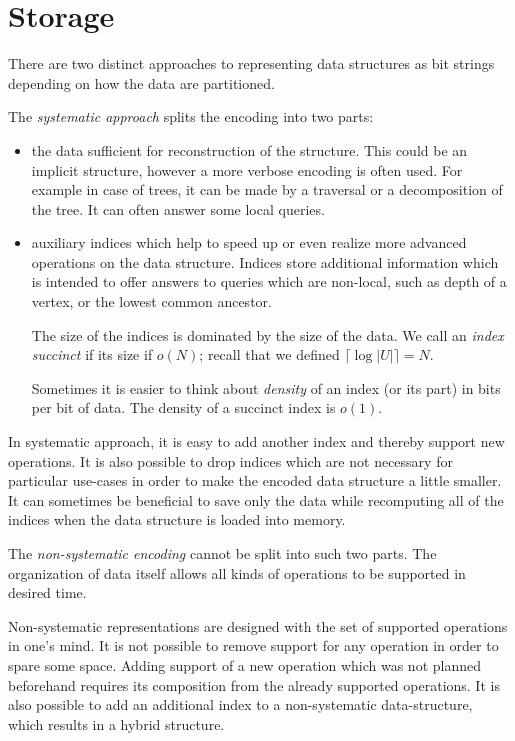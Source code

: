 \section{Storage}

There are two distinct approaches to representing data structures as bit strings depending on how the data are partitioned.

The \emph{systematic approach} splits the encoding into two parts:
\begin{itemize}
	\item the data sufficient for reconstruction of the structure.
	This could be an implicit structure, however a more verbose encoding is often used.
	For example in case of trees, it can be made by a traversal or a decomposition of the tree.
	It can often answer some local queries.
	\item auxiliary indices which help to speed up or even realize more advanced operations on the data structure.
	Indices store additional information which is intended to offer answers to queries which are non-local, such as depth of a vertex, or the lowest common ancestor.

	The size of the indices is dominated by the size of the data.	
	We call an \emph{index succinct} if its size if $o(N)$; recall that we defined $\lceil \log |U| \rceil = N$.
	
	Sometimes it is easier to think about \emph{density} of an index (or its part) in bits per bit of data.
	The density of a succinct index is $o(1)$.
\end{itemize}

In systematic approach, it is easy to add another index and thereby support new operations.
It is also possible to drop indices which are not necessary for particular use-cases in order to make the encoded data structure a little smaller.
It can sometimes be beneficial to save only the data while recomputing all of the indices when the data structure is loaded into memory.

\bigbreak

The \emph{non-systematic encoding} cannot be split into such two parts.
The organization of data itself allows all kinds of operations to be supported in desired time.

Non-systematic representations are designed with the set of supported operations in one's mind.
It is not possible to remove support for any operation in order to spare some space.
Adding support of a new operation which was not planned beforehand requires its composition from the already supported operations.
It is also possible to add an additional index to a non-systematic data-structure, which results in a hybrid structure.

